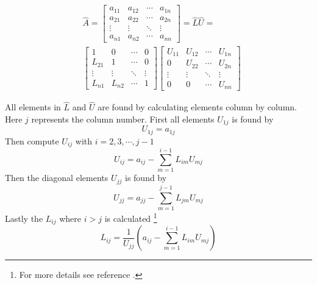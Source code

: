 \documentclass[twoside,twocolumn]{article}
\begin{document}
\begin{align*}
&\hat{A}= 
\begin{bmatrix}
a_{11}&a_{12}&\cdots &a_{1n}\\
a_{21}&a_{22}& \cdots & a_{2n}\\
\vdots&\vdots&\ddots&\vdots\\
a_{n1}&a_{n2}&\cdots&a_{nn}
\end{bmatrix}=\hat{L}\hat{U}=\\
&\begin{bmatrix}
1&0&\cdots &0\\
L_{21}&1& \cdots & 0\\
\vdots&\vdots&\ddots&\vdots\\
L_{n1}&L_{n2}&\cdots&1
\end{bmatrix}
\begin{bmatrix}
U_{11}&U_{12}&\cdots &U_{1n}\\
0&U_{22}& \cdots & U_{2n}\\
\vdots&\vdots&\ddots&\vdots\\
0&0&\cdots&U_{nn}\end{bmatrix} 
\end{align*}

All elements in $\hat{L}$ and $\hat{U}$ are found by calculating elements column by column. Here $j$ represents the column number.
First all elements $U_{1j}$ is found by
\begin{equation*}
    U_{1j} = a_{1j}    
\end{equation*}
Then compute $U_{ij}$ with $i = 2,3,\cdots,j-1$
\begin{equation*}
    U_{ij} = a_{ij}-\sum_{m=1}^{i-1}L_{im}U_{mj} 
\end{equation*}
Then the diagonal elements $U_{jj}$ is found by
\begin{equation*}
    U_{jj} = a_{jj}-\sum_{m=1}^{j-1}L_{jm}U_{mj} 
\end{equation*}
Lastly the $L_{ij}$ where $i>j$ is calculated \footnote{For more details see reference \cite{compfys}.}
\begin{equation*}
    L_{ij} = \frac{1}{U_{jj}}\left(a_{ij}-\sum_{m=1}^{i-1}L_{im}U_{mj}\right)
\end{equation*}
\end{document}
